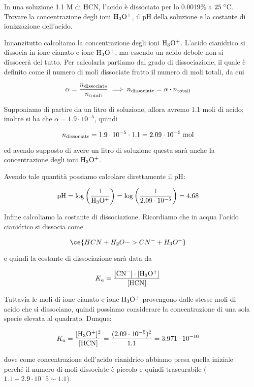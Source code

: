 \newpage

\begin{esercizio}
    In una soluzione 1.1 M di HCN, l'acido è dissociato per lo 0.0019\% a $25 \; ^{\circ} \rm C$. Trovare la concentrazione degli ioni $\rm H_3O^+$, il pH della soluzione e la costante di ionizzazione dell'acido.
\end{esercizio}
\begin{soluzione}
    Innanzitutto calcoliamo la concentrazione degli ioni $\rm H_3O^+$. L'acido cianidrico si dissocia in ione cianato e ione $\rm H_3O^+$, ma essendo un acido debole non si dissocerà del tutto. Per calcolarla partiamo dal grado di dissociazione, il quale è definito come il numero di moli dissociate fratto il numero di moli totali, da cui

$$\alpha=\frac{n_{\rm dissociate}}{n_{\rm totali}}
\implies
n_{\rm dissociate}=\alpha \cdot n_{\rm totali}$$

Supponiamo di partire da un litro di soluzione, allora avremo 1.1 moli di acido; inoltre si ha che $\alpha=1.9 \cdot 10^{-5}$, quindi

$$n_{\rm dissociate}=1.9 \cdot 10^{-5} \cdot 1.1
=2.09 \cdot 10^{-5} \; \rm mol$$

ed avendo supposto di avere un litro di soluzione questa sarà anche la concentrazione degli ioni $\rm H_3O^+$.

Avendo tale quantità possiamo calcolare direttamente il pH:

$$\rm pH=\log{\left(\frac{1}{H_3O^+}\right)}
=\log{\left(\frac{1}{2.09 \cdot 10^{-5}}\right)}=4.68$$

Infine calcoliamo la costante di dissociazione. Ricordiamo che in acqua l'acido cianidrico si dissocia come

$$\ce{HCN + H_2O -> CN^- + H_3O^+}$$

e quindi la costante di dissociazione sarà data da

$$K_a=\rm \frac{[CN^-]\cdot[H_3O^+]}{[HCN]}$$

Tuttavia le moli di ione cianato e ione $\rm H_3O^+$ provengono dalle stesse moli di acido che si dissociano, quindi possiamo considerare la concentrazione di una sola specie elevata al quadrato. Dunque:

$$K_a=\rm \frac{[H_3O^+]^2}{[HCN]}=\frac{(2.09 \cdot 10^{-5})^2}{1.1}=3.971 \cdot 10^{-10}$$

dove come concentrazione dell'acido cianidrico abbiamo presa quella iniziale perché il numero di moli dissociate è piccolo e quindi trascurabile ($1.1 - 2.9 \cdot 10^-5 \sim 1.1$).
\end{soluzione}

